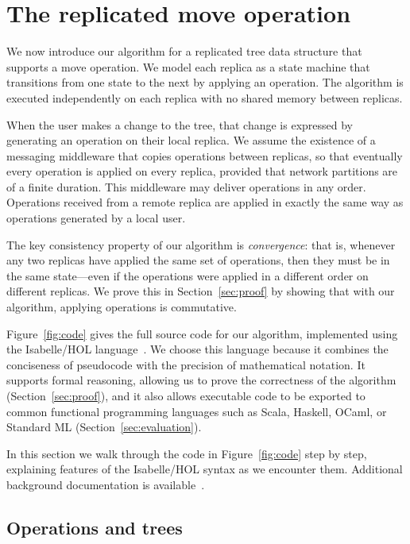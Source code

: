 \documentclass[sigconf]{acmart}
\begin{document}
\section{The replicated move operation}\label{sec:algorithm}

We now introduce our algorithm for a replicated tree data structure that supports a move operation.
We model each replica as a state machine that transitions from one state to the next by applying an operation.
The algorithm is executed independently on each replica with no shared memory between replicas.

When the user makes a change to the tree, that change is expressed by generating an operation on their local replica.
We assume the existence of a messaging middleware that copies operations between replicas, so that eventually every operation is applied on every replica, provided that network partitions are of a finite duration.
This middleware may deliver operations in any order.
Operations received from a remote replica are applied in exactly the same way as operations generated by a local user.

The key consistency property of our algorithm is \emph{convergence}: that is, whenever any two replicas have applied the same set of operations, then they must be in the same state---even if the operations were applied in a different order on different replicas.
We prove this in Section~\ref{sec:proof} by showing that with our algorithm, applying operations is commutative.

Figure~\ref{fig:code} gives the full source code for our algorithm, implemented using the Isabelle/HOL language~\cite{DBLP:conf/tphol/WenzelPN08}.
We choose this language because it combines the conciseness of pseudocode with the precision of mathematical notation.
It supports formal reasoning, allowing us to prove the correctness of the algorithm (Section~\ref{sec:proof}), and it also allows executable code to be exported to common functional programming languages such as Scala, Haskell, OCaml, or Standard ML (Section~\ref{sec:evaluation}).

In this section we walk through the code in Figure~\ref{fig:code} step by step, explaining features of the Isabelle/HOL syntax as we encounter them.
Additional background documentation is available~\cite{DBLP:books/sp/NipkowK14}.

\subsection{Operations and trees}\label{sec:ops-trees}
\end{document}
